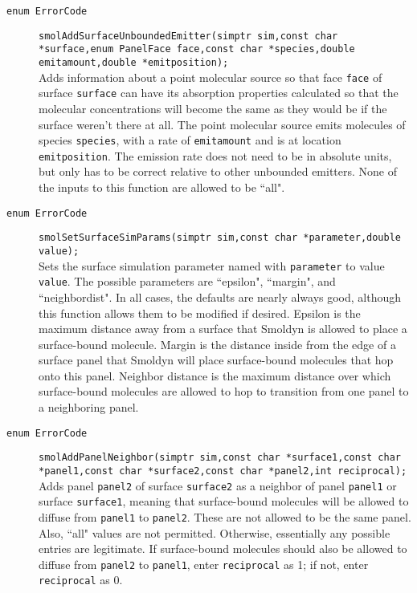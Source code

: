 \documentclass {book}
\begin{document}
\begin{description}
\item[\texttt{enum ErrorCode}]
\texttt{smolAddSurfaceUnboundedEmitter(simptr sim,const char *surface,enum PanelFace face,const char *species,double emitamount,double *emitposition);}
\hfill \\
Adds information about a point molecular source so that face \texttt{face} of surface \texttt{surface} can have its absorption properties calculated so that the molecular concentrations will become the same as they would be if the surface weren't there at all.  The point molecular source emits molecules of species \texttt{species}, with a rate of \texttt{emitamount} and is at location \texttt{emitposition}.  The emission rate does not need to be in absolute units, but only has to be correct relative to other unbounded emitters.  None of the inputs to this function are allowed to be ``all".

\item[\texttt{enum ErrorCode}]
\texttt{smolSetSurfaceSimParams(simptr sim,const char *parameter,double value);}
\hfill \\
Sets the surface simulation parameter named with \texttt{parameter} to value \texttt{value}.  The possible parameters are ``epsilon", ``margin", and ``neighbordist".  In all cases, the defaults are nearly always good, although this function allows them to be modified if desired.  Epsilon is the maximum distance away from a surface that Smoldyn is allowed to place a surface-bound molecule.  Margin is the distance inside from the edge of a surface panel that Smoldyn will place surface-bound molecules that hop onto this panel.  Neighbor distance is the maximum distance over which surface-bound molecules are allowed to hop to transition from one panel to a neighboring panel.

\item[\texttt{enum ErrorCode}]
\texttt{smolAddPanelNeighbor(simptr sim,const char *surface1,const char *panel1,const char *surface2,const char *panel2,int reciprocal);}
\hfill \\
Adds panel \texttt{panel2} of surface \texttt{surface2} as a neighbor of panel \texttt{panel1} or surface \texttt{surface1}, meaning that surface-bound molecules will be allowed to diffuse from \texttt{panel1} to \texttt{panel2}.  These are not allowed to be the same panel.  Also, ``all" values are not permitted.  Otherwise, essentially any possible entries are legitimate.  If surface-bound molecules should also be allowed to diffuse from \texttt{panel2} to \texttt{panel1}, enter \texttt{reciprocal} as 1; if not, enter \texttt{reciprocal} as 0.


\end{description}
\end{document}
